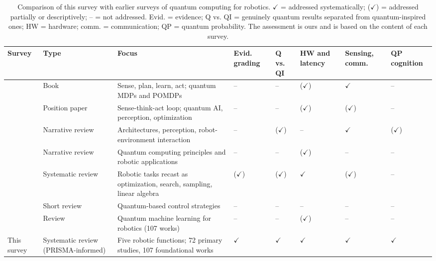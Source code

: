 \documentclass[acmsmall,screen,review]{acmart}
\begin{document}
\begin{table}[t]
\caption{Comparison of this survey with earlier surveys of quantum computing for robotics. $\checkmark$ = addressed systematically; ($\checkmark$) = addressed partially or descriptively; -- = not addressed. Evid. = evidence; Q vs. QI = genuinely quantum results separated from quantum-inspired ones; HW = hardware; comm. = communication; QP = quantum probability. The assessment is ours and is based on the content of each survey.}
\label{tab:surveys}
\footnotesize
\begin{tabular}{@{}>{\raggedright\arraybackslash}p{0.160\dimexpr\linewidth-16\tabcolsep\relax}>{\raggedright\arraybackslash}p{0.130\dimexpr\linewidth-16\tabcolsep\relax}>{\raggedright\arraybackslash}p{0.230\dimexpr\linewidth-16\tabcolsep\relax}>{\raggedright\arraybackslash}p{0.096\dimexpr\linewidth-16\tabcolsep\relax}>{\raggedright\arraybackslash}p{0.096\dimexpr\linewidth-16\tabcolsep\relax}>{\raggedright\arraybackslash}p{0.096\dimexpr\linewidth-16\tabcolsep\relax}>{\raggedright\arraybackslash}p{0.096\dimexpr\linewidth-16\tabcolsep\relax}>{\raggedright\arraybackslash}p{0.096\dimexpr\linewidth-16\tabcolsep\relax}@{}}
\toprule
\textbf{Survey} & \textbf{Type} & \textbf{Focus} & \textbf{Evid. grading} & \textbf{Q vs. QI} & \textbf{HW and latency} & \textbf{Sensing, comm.} & \textbf{QP cognition} \\ \midrule
\citet{Tandon2017} & Book & Sense, plan, learn, act; quantum MDPs and POMDPs & -- & -- & ($\checkmark$) & $\checkmark$ & -- \\
\citet{Petschnigg2019} & Position paper & Sense-think-act loop; quantum AI, perception, optimization & -- & -- & ($\checkmark$) & ($\checkmark$) & -- \\
\citet{Yan2024} & Narrative review & Architectures, perception, robot-environment interaction & -- & ($\checkmark$) & -- & $\checkmark$ & ($\checkmark$) \\
\citet{Haldorai2024} & Narrative review & Quantum computing principles and robotic applications & -- & -- & ($\checkmark$) & -- & -- \\
\citet{Udekwe2025} & Systematic review & Robotic tasks recast as optimization, search, sampling, linear algebra & ($\checkmark$) & ($\checkmark$) & $\checkmark$ & ($\checkmark$) & -- \\
\citet{Fazilat2025a} & Short review & Quantum-based control strategies & -- & -- & -- & -- & -- \\
\citet{Nigatu2026} & Review & Quantum machine learning for robotics (107 works) & -- & -- & ($\checkmark$) & -- & -- \\
This survey & Systematic review (PRISMA-informed) & Five robotic functions; 72 primary studies, 107 foundational works & $\checkmark$ & $\checkmark$ & $\checkmark$ & $\checkmark$ & $\checkmark$ \\
\bottomrule
\end{tabular}
\end{table}
\end{document}
